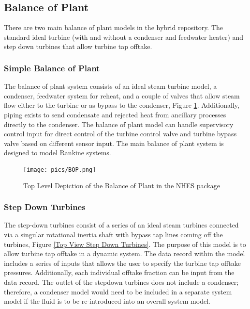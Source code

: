 \subsection{Balance of Plant}
There are two main balance of plant models in the hybrid repository. The standard ideal turbine (with and without a condenser and feedwater heater) and step down turbines that allow turbine tap offtake.


\subsubsection{Simple Balance of Plant}

The balance of plant system consists of an ideal steam turbine model, a condenser, feedwater system for reheat, and a couple of valves that allow steam flow either to the turbine or as bypass to the condenser, Figure \ref{Top View SimpleBOP}. Additionally, piping exists to send condensate and rejected heat from ancillary processes directly to the condenser. The balance of plant model can handle supervisory control input for direct control of the turbine control valve and turbine bypass valve based on different sensor input. The main balance of plant system is designed to model Rankine systems.  

\begin{figure}[hbtp]
\centering
\texttt{[image: pics/BOP.png]}
\caption{Top Level Depiction of the Balance of Plant in the NHES package}
\label{Top View SimpleBOP}
\end{figure}


\subsubsection{Step Down Turbines}

The step-down turbines consist of a series of an ideal steam turbines connected via a singular rotational inertia shaft with bypass tap lines coming off the turbines, Figure \ref{Top View Step Down Turbines}. The purpose of this model is to allow turbine tap offtake in a dynamic system. The data record within the model includes a series of inputs that allows the user to specify the turbine tap offtake pressures. Additionally, each individual offtake fraction can be input from the data record. The outlet of the stepdown turbines does not include a condenser; therefore, a condenser model would need to be included in a separate system model if the fluid is to be re-introduced into an overall system model.
 
